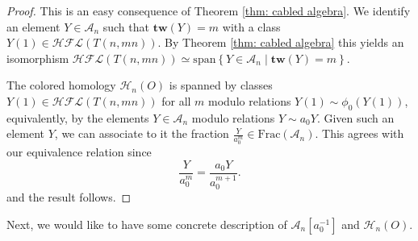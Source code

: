 \documentclass{amsart}
\newtheorem{lemma}[theorem]{Lemma}
\newcommand{\CA}{\mathcal{A}}
\newcommand{\F}{\mathbb{F}}
\newcommand{\cHFL}{\mathcal{H\!F\! L}}
\newcommand{\ovl}{\overline}
\newcommand{\HD}{\mathcal{H}}
\newcommand{\tw}{\mathbf{tw}}
\newcommand{\UU}{\mathbf{U}}
\newcommand{\A}{\mathfrak{A}}
\newcommand{\cc}{\mathbf{c}}
\newcommand{\spann}{\mathrm{span}}
\newcommand{\stab}{\mathrm{stab}}
\renewcommand{\ss}{\mathbf{s}}
\begin{document}
\begin{proof}
This is an easy consequence of Theorem \ref{thm: cabled algebra}. We identify an element $Y\in \CA_n$ such that $\tw(Y)=m$ with a class $Y(1)\in \cHFL(T(n,mn))$. By Theorem \ref{thm: cabled algebra} this yields an isomorphism $\cHFL(T(n,mn))\simeq \spann\left\{Y\in \CA_n\mid \tw(Y)=m\right\}$.


The colored homology $\HD_{n}(O)$ is spanned by classes $Y(1)\in \cHFL(T(n,mn))$ for all $m$ modulo relations $Y(1)\sim \phi_0(Y(1))$, equivalently, by the elements $Y\in \CA_n$ modulo relations $Y\sim a_0Y$. Given such an element $Y$, we can associate to it the fraction $\frac{Y}{a_0^m}\in \mathrm{Frac}(\CA_n)$. This agrees with our equivalence relation since  
$$
\frac{Y}{a_0^m}=\frac{a_0Y}{a_0^{m+1}}.
$$
and the result follows. 
\end{proof}


 Next, we would like to have some concrete description of $\CA_n[a_0^{-1}]$ and $\HD_n(O)$.




\end{document}
